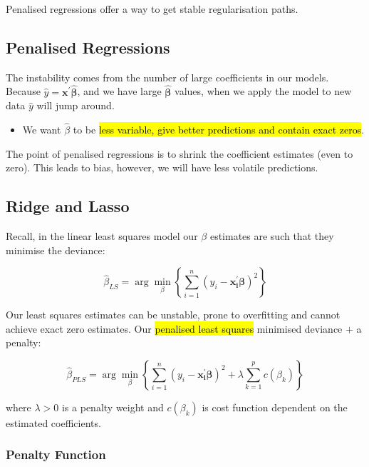 \documentclass[11pt]{article}
\begin{document}
Penalised regressions offer a way to get stable regularisation paths.

\subsection{Penalised Regressions}

The instability comes from the number of large coefficients in our models. Because $\hat{y} = \mathbf{x^\prime}\bm{\hat{\beta}}$, and we have large $\bm{\hat{\beta}}$ values, when we apply the model to new data $\hat{y}$ will jump around.

\begin{itemize}
    \item We want $\hat{\beta}$ to be \hl{less variable, give better predictions and contain exact zeros}.
\end{itemize}

The point of penalised regressions is to shrink the coefficient estimates (even to zero). This leads to bias, however, we will have less volatile predictions.



\subsection{Ridge and Lasso}

Recall, in the linear least squares model our $\beta$ estimates are such that they minimise the deviance:

\begin{equation*}
    \hat{\beta}_{LS} = \arg \underset{\beta}{\min} \left\{\sum_{i=1}^n(y_i - \mathbf{x_i^\prime}\bm{\beta})^2\right\}
\end{equation*}

Our least squares estimates can be unstable, prone to overfitting and cannot achieve exact zero estimates. Our \hl{penalised least squares} minimised deviance $+$ a penalty:

\begin{equation}
    \label{eq:pls}
    \hat{\beta}_{PLS} = \arg\underset{\beta}{\min}\left\{\sum_{i=1}^n(y_i - \mathbf{x_i^\prime}\bm{\beta})^2 + \lambda\sum_{k=1}^p c(\beta_k)\right\}
\end{equation}

where $\lambda >0$ is a penalty weight and $c(\beta_k)$ is cost function dependent on the estimated coefficients.

\subsubsection{Penalty Function}
\end{document}
